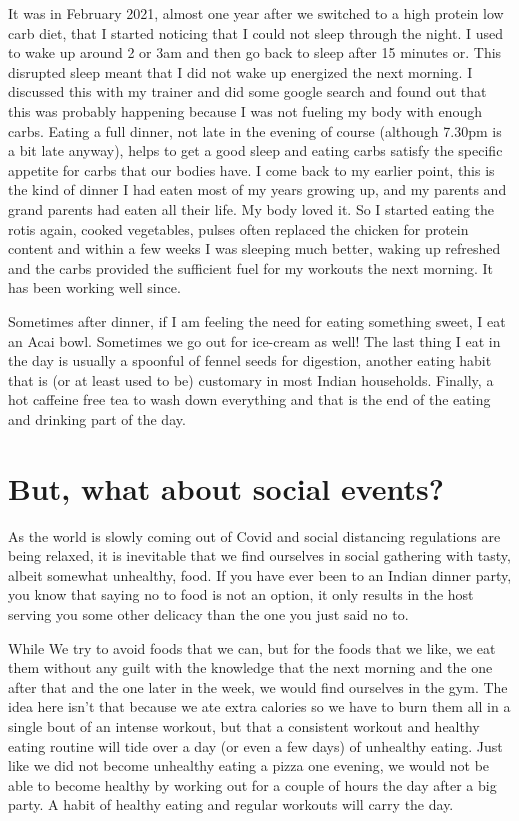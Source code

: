\documentclass[
  oneside]{book}
\begin{document}
It was in February 2021, almost one year after we switched to a high protein low carb diet, that I started noticing that I could not sleep through the night. I used to wake up around 2 or 3am and then go back to sleep after 15 minutes or. This disrupted sleep meant that I did not wake up energized the next morning. I discussed this with my trainer and did some google search and found out that this was probably happening because I was not fueling my body with enough carbs. Eating a full dinner, not late in the evening of course (although 7.30pm is a bit late anyway), helps to get a good sleep and eating carbs satisfy the specific appetite for carbs that our bodies have. I come back to my earlier point, this is the kind of dinner I had eaten most of my years growing up, and my parents and grand parents had eaten all their life. My body loved it. So I started eating the rotis again, cooked vegetables, pulses often replaced the chicken for protein content and within a few weeks I was sleeping much better, waking up refreshed and the carbs provided the sufficient fuel for my workouts the next morning. It has been working well since.

Sometimes after dinner, if I am feeling the need for eating something sweet, I eat an Acai bowl. Sometimes we go out for ice-cream as well! The last thing I eat in the day is usually a spoonful of fennel seeds for digestion, another eating habit that is (or at least used to be) customary in most Indian households. Finally, a hot caffeine free tea to wash down everything and that is the end of the eating and drinking part of the day.

\hypertarget{but-what-about-social-events}{%
\section{But, what about social events?}\label{but-what-about-social-events}}

As the world is slowly coming out of Covid and social distancing regulations are being relaxed, it is inevitable that we find ourselves in social gathering with tasty, albeit somewhat unhealthy, food. If you have ever been to an Indian dinner party, you know that saying no to food is not an option, it only results in the host serving you some other delicacy than the one you just said no to.

While We try to avoid foods that we can, but for the foods that we like, we eat them without any guilt with the knowledge that the next morning and the one after that and the one later in the week, we would find ourselves in the gym. The idea here isn't that because we ate extra calories so we have to burn them all in a single bout of an intense workout, but that a consistent workout and healthy eating routine will tide over a day (or even a few days) of unhealthy eating. Just like we did not become unhealthy eating a pizza one evening, we would not be able to become healthy by working out for a couple of hours the day after a big party. A habit of healthy eating and regular workouts will carry the day.
\end{document}
